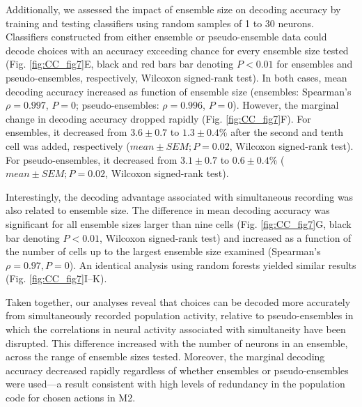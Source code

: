 Additionally, we assessed the impact of ensemble size on decoding accuracy by training and testing classifiers using random samples of 1 to 30 neurons. Classifiers constructed from either ensemble or pseudo-ensemble data could decode choices with an accuracy exceeding chance for every ensemble size tested (Fig. \ref{fig:CC_fig7}E, black and red bars bar denoting $P < 0.01$ for ensembles and pseudo-ensembles, respectively, Wilcoxon signed-rank test). In both cases, mean decoding accuracy increased as function of ensemble size (ensembles: Spearman's $\rho = 0.997$, $P = 0$; pseudo-ensembles: $\rho = 0.996$, $P = 0$). However, the marginal change in decoding accuracy dropped rapidly (Fig. \ref{fig:CC_fig7}F). For ensembles, it decreased from $3.6 \pm 0.7$ to $1.3 \pm 0.4\%$ after the second and tenth cell was added, respectively ($mean \pm SEM; P = 0.02$, Wilcoxon signed-rank test). For pseudo-ensembles, it decreased from $3.1 \pm 0.7$ to $0.6 \pm 0.4\%$ ($mean \pm SEM; P = 0.02$, Wilcoxon signed-rank test).

Interestingly, the decoding advantage associated with simultaneous recording was also related to ensemble size. The difference in mean decoding accuracy was significant for all ensemble sizes larger than nine cells (Fig. \ref{fig:CC_fig7}G, black bar denoting $P < 0.01$, Wilcoxon signed-rank test) and increased as a function of the number of cells up to the largest ensemble size examined (Spearman's $\rho = 0.97, P = 0$). An identical analysis using random forests yielded similar results (Fig. \ref{fig:CC_fig7}I–K).

Taken together, our analyses reveal that choices can be decoded more accurately from simultaneously recorded population activity, relative to pseudo-ensembles in which the correlations in neural activity associated with simultaneity have been disrupted. This difference increased with the number of neurons in an ensemble, across the range of ensemble sizes tested. Moreover, the marginal decoding accuracy decreased rapidly regardless of whether ensembles or pseudo-ensembles were used—a result consistent with high levels of redundancy in the population code for chosen actions in M2.